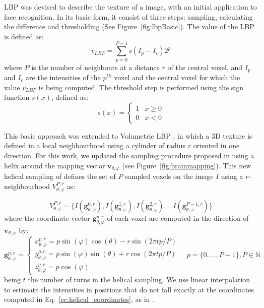 \ac{LBP} was devised to describe the texture of a image, with an initial application to face recognition. In its basic form, it consist of three steps: sampling, calculating the difference and thresholding (See Figure~\ref{fig:lbpBasic}). The value of the \ac{LBP} is defined as:
\begin{equation}
v_{LBP} = \sum_{p=0}^{P-1} s(I_p - I_c)2^p
\end{equation}
where $P$ is the number of neighbours at a distance $r$ of the central voxel, and $I_p$ and $I_c$ are the intensities of the $p^{th}$ voxel and the central voxel for which the value $v_{LBP}$ is being computed. The threshold step is performed using the sign function $s(x)$, defined as:
\begin{equation} %
s(x) = 
\begin{cases}
1      &  x \geq 0 \\
0      &  x < 0
\end{cases}
\end{equation}

This basic approach was extended to Volumetric \ac{LBP} \cite{Zhao2007}, in which a 3D texture is defined in a local neighbourhood using a cylinder of radius $r$ oriented in one direction. For this work, we updated the sampling procedure proposed in \cite{Zhao2007} using a helix around the mapping vector $\mathbf{v}_{\theta,\varphi}$ (see Figure~\ref{fig:brainmapping}). This new helical sampling of \cite{Martinez-MurciaVRLBP} defines the set of $P$ sampled voxels on the image $I$ using a $r$-neighbourhood $V_{\theta,\varphi}^{P,r}$ as:

\begin{equation}
V_{\theta,\varphi}^{P,r}=\lbrace I(\mathbf{g}_{\theta,\varphi}^{0,r}), I(\mathbf{g}_{\theta,\varphi}^{1,r}), I(\mathbf{g}_{\theta,\varphi}^{2,r}), \dots I(\mathbf{g}_{\theta,\varphi}^{P-1,r})\rbrace
\end{equation} 
where the coordinate vector $\mathbf{g}_{\theta,\varphi}^{p,r}$ of each voxel are computed in the direction of $\mathbf{v}_{\theta,\varphi}$ by: 
\begin{equation}
\label{ec:helical_coordinates}
\mathbf{g}_{\theta,\varphi}^{p,r}=\begin{cases}
x_{\theta,\varphi}^{p,r}=p\sin(\varphi)\cos(\theta)-r\sin(2\pi tp/P)\\
y_{\theta,\varphi}^{p,r}=p\sin(\varphi)\sin(\theta)+r\cos(2\pi tp/P)\\
z_{\theta,\varphi}^{p,r}=p\cos(\varphi) 
\end{cases} \quad p=\{0,...,P-1\}, P \in \mathbb{N}
\end{equation}
being $t$ the number of turns in the helical sampling. We use linear interpolation to estimate the intensities in positions that do not fall exactly at the coordinates computed in Eq.~\ref{ec:helical_coordinates}, as in \cite{Zhao2007}. 

